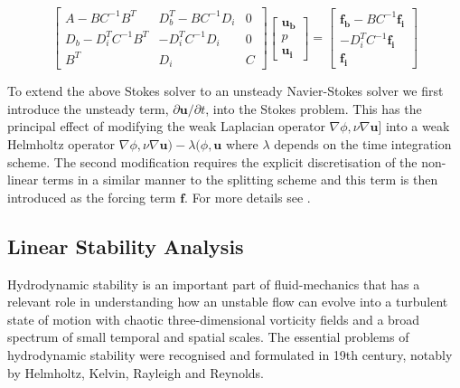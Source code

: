 \begin{equation}
\left[ \begin{array}{ccc}
 A-BC^{-1}B^T & D_b^T-BC^{-1}D_i & 0\\
 D_b-D_i^TC^{-1}B^T & -D_i^TC^{-1}D_i & 0\\
 B^T & D_i & C
 \end{array}\right]
 \left[ \begin{array}{c}
 \boldsymbol{u_b}\\
 p\\
 \boldsymbol{u_i}
 \end{array}\right] =
 \left[ \begin{array}{c}
 \boldsymbol{f_b} - BC^{-1}\boldsymbol{f_i}\\
 -D_i^TC^{-1}\boldsymbol{f_i}\\
 \boldsymbol{f_i}
 \end{array}\right]
 \end{equation}

 To extend the above Stokes solver to an unsteady Navier-Stokes solver
 we first introduce the unsteady term, $\partial
 \boldsymbol{u}/\partial t$, into the Stokes problem.  This has the
 principal effect of modifying the weak Laplacian operator
 $\nabla\phi,\nu\nabla\boldsymbol{u}$] into a weak Helmholtz operator
   $\nabla\phi,\nu\nabla\boldsymbol{u})-\lambda(\phi,\boldsymbol{u}$
   where $\lambda$ depends on the time integration scheme. The second
   modification requires the explicit discretisation of the non-linear
   terms in a similar manner to the splitting scheme and this term is
   then introduced as the forcing term $\boldsymbol{f}$. For more details see \cite{AiSh,ShAi}.

\subsection{Linear Stability Analysis}

Hydrodynamic stability is an important part of fluid-mechanics that has a relevant role in understanding how an unstable flow can evolve into a turbulent state of motion with chaotic three-dimensional vorticity fields and a broad spectrum of small temporal and spatial scales. The essential problems of hydrodynamic stability were recognised and formulated in 19th century, notably by Helmholtz, Kelvin, Rayleigh and Reynolds.

